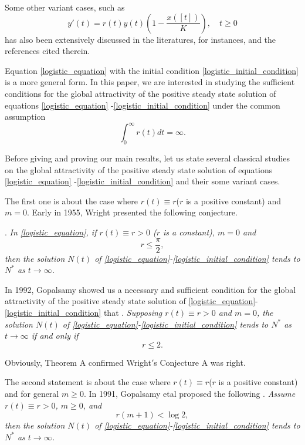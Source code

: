 \documentclass{HZNUMCM}
\begin{document}
Some other variant cases, such as
\begin{equation*}\label{case_eq}
y'(t)=r(t) y(t) \left(1-\frac{x([t])}K\right),\quad t\geqslant 0
\end{equation*}
has also been extensively discussed in the literatures, for instances,
\cite{1995_so_MR1317052,2008_li_MR2386489,2000_lyj_MR1770856,2001_ni_MR1881865,2011_Ozturk_1532,1995_so_R1339824,1992_Gopalsamy,2005_hu_MR2168581,2009_zhang_MR2537726,wxp_1999}
and the references cited therein.


Equation \eqref{logistic_equation} with the initial condition \eqref{logistic_initial_condition}  is  a more general form.
In this paper, we are interested in studying the sufficient conditions for the global attractivity of the positive steady state  solution of equations \eqref{logistic_equation} -\eqref{logistic_initial_condition} under the common assumption
\begin{equation}\label{common_condition}
\int_0^{\infty}r(t)dt=\infty.
\end{equation}

Before giving and proving our main results, let us state several classical studies on the global attractivity of the positive steady state solution of equations \eqref{logistic_equation} -\eqref{logistic_initial_condition}  and their some variant cases.


The first one is about the case where $r(t)\equiv r$($r$ is a
positive constant) and $m=0$. Early in 1955, Wright \cite{1955_Wright_MR0072363}  presented the following  conjecture.

 \vskip 0.2cm. {\it In \eqref{logistic_equation}, if $r(t)\equiv r>0$ ($r$ is a constant), $m=0$ and
 $$r\leqslant\frac {\pi}{2},$$then the solution $N(t)$ of \eqref{logistic_equation}-\eqref{logistic_initial_condition}  tends to $N^*$ as $t\rightarrow\infty$.}

In 1992, Gopalsamy \cite{1992_Gopalsamy} showed  us a necessary  and sufficient condition for the global attractivity  of the positive steady state solution of \eqref{logistic_equation}-\eqref{logistic_initial_condition}  that
\vskip 0.2cm .
{\it Supposing $r(t)\equiv r>0$ and $m=0$, the solution $N(t)$ of \eqref{logistic_equation}-\eqref{logistic_initial_condition} tends to $N^*$ as $t\rightarrow\infty$ if and only if $$r \leqslant 2.$$
}

Obviously,   Theorem A confirmed Wright$'$s Conjecture A was right.

The second statement is about the case where $r(t)\equiv r$($r$ is a
positive constant) and for general $m\geqslant 0$.
In 1991, Gopalsamy etal \cite{1991_gopalsamy_MR1079622} proposed the following
\vskip 0.2cm .
{\it Assume $r(t)\equiv r>0$, $m\geqslant0$, and
\begin{equation}\label{go_condition}
r(m+1)<\log 2,
\end{equation} then the solution $N(t)$ of \eqref{logistic_equation}-\eqref{logistic_initial_condition}  tends to $N^*$ as $t\rightarrow\infty$.
}
\end{document}
